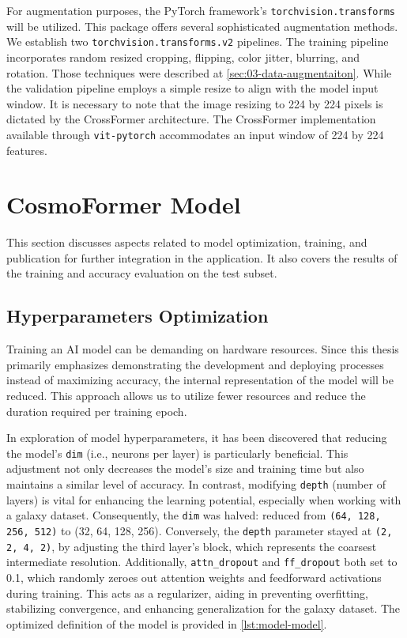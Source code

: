 For augmentation purposes, the PyTorch framework's \texttt{torchvision.transforms} will be utilized. This package offers several sophisticated augmentation methods. We establish two \texttt{torchvision.transforms.v2} pipelines. The training pipeline incorporates random resized cropping, flipping, color jitter, blurring, and rotation. Those techniques were described at \autoref{sec:03-data-augmentaiton}. While the validation pipeline employs a simple resize to align with the model input window. It is necessary to note that the image resizing to 224 by 224 pixels is dictated by the CrossFormer architecture. The CrossFormer implementation available through \texttt{vit-pytorch} accommodates an input window of 224 by 224 features. 

\section{CosmoFormer Model}

This section discusses aspects related to model optimization, training, and publication for further integration in the application. It also covers the results of the training and accuracy evaluation on the test subset.

\subsection*{Hyperparameters Optimization}
\label{sec:model-optimizations}

Training an AI model can be demanding on hardware resources. Since this thesis primarily emphasizes demonstrating the development and deploying processes instead of maximizing accuracy, the internal representation of the model will be reduced. This approach allows us to utilize fewer resources and reduce the duration required per training epoch.

In exploration of model hyperparameters, it has been discovered that reducing the model's \texttt{dim} (i.e., neurons per layer) is particularly beneficial. This adjustment not only decreases the model's size and training time but also maintains a similar level of accuracy. In contrast, modifying \texttt{depth} (number of layers) is vital for enhancing the learning potential, especially when working with a galaxy dataset. Consequently, the \texttt{dim} was halved: reduced from \texttt{(64, 128, 256, 512)} to (32, 64, 128, 256). Conversely, the \texttt{depth} parameter stayed at \texttt{(2, 2, 4, 2)}, by adjusting the third layer's block, which represents the coarsest intermediate resolution. Additionally, \texttt{attn\_dropout} and \texttt{ff\_dropout} both set to 0.1, which randomly zeroes out attention weights and feedforward activations during training. This acts as a regularizer, aiding in preventing overfitting, stabilizing convergence, and enhancing generalization for the galaxy dataset. The optimized definition of the model is provided in \autoref{lst:model-model}.


